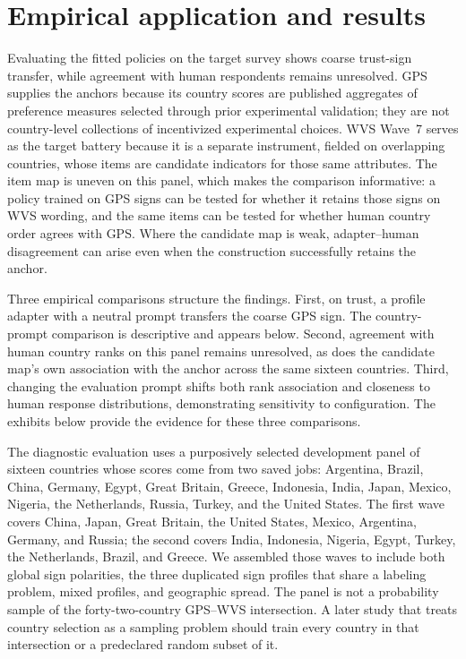 \section{Empirical application and results}\label{sec:results}
Evaluating the fitted policies on the target survey shows coarse trust-sign transfer, while agreement with human respondents remains unresolved. GPS supplies the anchors because its country scores are published aggregates of preference measures selected through prior experimental validation; they are not country-level collections of incentivized experimental choices. WVS Wave~7 serves as the target battery because it is a separate instrument, fielded on overlapping countries, whose items are candidate indicators for those same attributes. The item map is uneven on this panel, which makes the comparison informative: a policy trained on GPS signs can be tested for whether it retains those signs on WVS wording, and the same items can be tested for whether human country order agrees with GPS. Where the candidate map is weak, adapter--human disagreement can arise even when the construction successfully retains the anchor.

Three empirical comparisons structure the findings. First, on trust, a profile adapter with a neutral prompt transfers the coarse GPS sign. The country-prompt comparison is descriptive and appears below. Second, agreement with human country ranks on this panel remains unresolved, as does the candidate map's own association with the anchor across the same sixteen countries. Third, changing the evaluation prompt shifts both rank association and closeness to human response distributions, demonstrating sensitivity to configuration. The exhibits below provide the evidence for these three comparisons.

The diagnostic evaluation uses a purposively selected development panel of sixteen countries whose scores come from two saved jobs: Argentina, Brazil, China, Germany, Egypt, Great Britain, Greece, Indonesia, India, Japan, Mexico, Nigeria, the Netherlands, Russia, Turkey, and the United States. The first wave covers China, Japan, Great Britain, the United States, Mexico, Argentina, Germany, and Russia; the second covers India, Indonesia, Nigeria, Egypt, Turkey, the Netherlands, Brazil, and Greece. We assembled those waves to include both global sign polarities, the three duplicated sign profiles that share a labeling problem, mixed profiles, and geographic spread. The panel is not a probability sample of the forty-two-country GPS--WVS intersection. A later study that treats country selection as a sampling problem should train every country in that intersection or a predeclared random subset of it.

